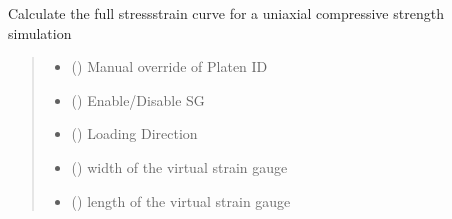 \documentclass[letterpaper,10pt,english]{sphinxmanual}
\begin{document}
\begin{fulllineitems}
\begin{fulllineitems}
\label{\detokenize{pyfdempp:pyfdempp.pyfdempp.Model.complete_UCS_stress_strain}}
\pysigstartsignatures
{}
\pysigstopsignatures
\sphinxAtStartPar
Calculate the full stress\sphinxhyphen{}strain curve for a uniaxial compressive strength simulation
\begin{quote}\begin{description}
\begin{itemize}
\item {} 
\sphinxAtStartPar
{} () \textendash{} Manual override of Platen ID

\item {} 
\sphinxAtStartPar
{} () \textendash{} Enable/Disable SG

\item {} 
\sphinxAtStartPar
{} () \textendash{} Loading Direction

\item {} 
\sphinxAtStartPar
{} () \textendash{} width of the virtual strain gauge

\item {} 
\sphinxAtStartPar
{} () \textendash{} length of the virtual strain gauge


\end{itemize}
\end{description}
\end{quote}
\end{fulllineitems}
\end{fulllineitems}
\end{document}
